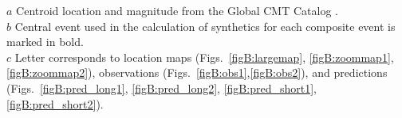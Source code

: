 \documentclass[12pt,oneside]{book}
\begin{document}
\normalsize
\begin{flushleft}
$a$ Centroid location and magnitude from the Global CMT Catalog \citep{Dziewonski1981,Ekstrom2012}.\\
$b$ Central event used in the calculation of synthetics for each composite event is marked in bold. \\
$c$ Letter corresponds to location maps (Figs.~\ref{figB:largemap}, \ref{figB:zoommap1}, \ref{figB:zoommap2}), observations (Figs.~\ref{figB:obs1},\ref{figB:obs2}), and predictions (Figs.~\ref{figB:pred_long1}, \ref{figB:pred_long2}, \ref{figB:pred_short1}, \ref{figB:pred_short2}). \\

\end{flushleft}
\clearpage

\normalsize
\singlespacing
\end{document}
